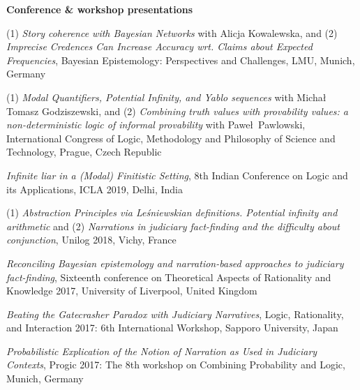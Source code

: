 \documentclass[10pt, a4paper]{article}
\newcommand{\years}[1]{\marginnote{\normalsize #1}}
\begin{document}
 {\sc \textbf{Conference \& workshop presentations}}\normalsize



\noindent

\vspace{1.5mm}


\years{2020}  (1) \emph{Story coherence with Bayesian Networks} with Alicja Kowalewska, and (2) \emph{ Imprecise Credences Can Increase Accuracy wrt. Claims about Expected Frequencies}, Bayesian Epistemology: Perspectives and Challenges, LMU, Munich, Germany





\years{2019} (1) \emph{Modal Quantifiers, Potential Infinity, and Yablo sequences} with Micha\l\, Tomasz Godziszewski, and (2) \emph{Combining truth values with provability values: a non-deterministic logic of informal provability} with Pawe\l\, Pawlowski, International Congress of Logic, Methodology and Philosophy of Science and Technology, Prague, Czech Republic


\years{2018}

\emph{Infinite liar in a (Modal) Finitistic Setting}, 8th Indian Conference on Logic and its Applications, ICLA 2019, Delhi, India

\vspace{0.5mm}

(1) \emph{Abstraction Principles via Le{\'s}niewskian definitions. Potential infinity and arithmetic} and (2) \emph{Narrations in judiciary fact-finding and the difficulty about conjunction}, Unilog 2018, Vichy, France

\years{2017} \emph{Reconciling Bayesian epistemology and narration-based approaches to judiciary fact-finding},   Sixteenth conference on
Theoretical Aspects of Rationality and Knowledge 2017, University of Liverpool, United Kingdom


\vspace{0.5mm}


\emph{Beating the Gatecrasher Paradox with Judiciary Narratives},
Logic, Rationality, and Interaction 2017: 6th International Workshop, Sapporo University, Japan



\vspace{0.5mm}


 \emph{Probabilistic Explication of the Notion of Narration as Used in Judiciary Contexts}, Progic 2017: The 8th workshop on Combining Probability and Logic,  Munich, Germany
\end{document}
